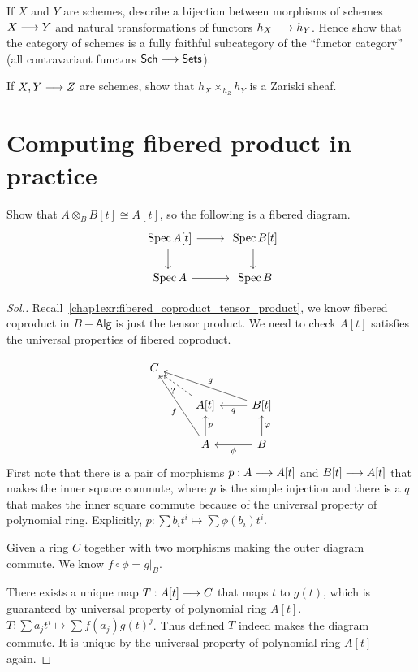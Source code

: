 \documentclass[11pt]{book} %
\begin{document}
\begin{exr}
If $X$ and $Y$ are schemes, describe a bijection between morphisms of schemes $X\longrightarrow Y$ and natural transformations of functors $h_X\longrightarrow h_Y$. Hence show that the category of schemes is a fully faithful subcategory of the ``functor category'' (all contravariant functors $\mathsf{Sch}\longrightarrow\mathsf{Sets}$).
\end{exr}
\begin{exr}
If $X,Y\longrightarrow Z$ are schemes, show that $h_X\times_{h_Z} h_Y$ is a Zariski sheaf.
\end{exr}

\section{Computing fibered product in practice}
\begin{exr}
Show that $A\otimes_B B[t]\cong A[t]$, so the following is a fibered diagram.
$$
\begin{tikzcd}
\spec A[t]\ar[r]\ar[d] & \spec B[t]\ar[d] \\
\spec A\ar[r]&\spec B 
\end{tikzcd}
 $$ 
\end{exr}
\begin{proof}[Sol.]
Recall~\ref{chap1exr:fibered_coproduct_tensor_product}, we know fibered coproduct in $B-\mathsf{Alg}$ is  just the tensor product. We need to check $A[t]$ satisfies the universal properties of fibered coproduct.

$$
\begin{tikzcd}
C &  &  \\
 & {A[t]} \arrow[lu, "?", dashed] & {B[t]} \arrow[l, "q"] \arrow[llu, "g"'] \\
 & A \arrow[luu, "f"] \arrow[u, "p"'] & B \arrow[u, "\varphi"'] \arrow[l, "\phi"]
\end{tikzcd}
$$
First note that there is a pair of morphisms $p:A\longrightarrow A[t]$ and $B[t]\longrightarrow A[t]$ that makes the inner square commute, where $p$ is the simple injection and there is a $q$ that makes the inner square commute because of the universal property of polynomial ring. Explicitly, $p:\sum b_i t^i\mapsto \sum \phi(b_i) t^i$. 

Given a ring $C$ together with two morphisms making the outer diagram commute. We know $f\circ \phi=g|_{B}$. 

There exists a unique map $T:A[t]\longrightarrow C$ that maps $t$ to $g(t)$, which is guaranteed by universal property of polynomial ring $A[t]$. $T:\sum a_j t^i\mapsto\sum f(a_j)g(t)^j$. Thus defined $T$ indeed makes the diagram commute. It is unique by the universal property of polynomial ring $A[t]$ again.
\end{proof}
\end{document}
